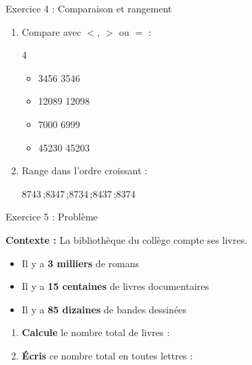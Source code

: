 \begin{exercisebox}{ Exercice 4 : Comparaison et rangement }
	\begin{enumerate}[label=\textcolor{primary}{\textbf{\alph*)}},leftmargin=*]
		\item Compare avec $<$, $>$ ou $=$ : 
		\begin{multicols}{4}
			\begin{itemize}[label=$\bullet$]
				\item \num{3456} \rep{$<$} \dotfill \num{3546}
				\item \num{12089} \rep{$<$} \dotfill \num{12098}
				\item \num{7000} \rep{$>$} \dotfill \num{6999}
				\item \num{45230} \rep{$>$} \dotfill \num{45203}
			\end{itemize}
		\end{multicols}
		\item Range dans l'ordre croissant : 
		\begin{center}
			\num{8743}\,;\quad \num{8347}\,;\quad \num{8734}\,;\quad \num{8437}\,;\quad \num{8374}
		\end{center}
	\end{enumerate}
\end{exercisebox}

\begin{exercisebox}{ Exercice 5 : Problème }
	\begin{tcolorbox}[colback=blue!5,colframe=primary!30,arc=2mm,boxrule=0.5pt]
		\textbf{Contexte :} La bibliothèque du collège compte ses livres.
		\begin{itemize}[noitemsep,topsep=5pt]
			\item Il y a \textbf{3 milliers} de romans
			\item Il y a \textbf{15 centaines} de livres documentaires
			\item Il y a \textbf{85 dizaines} de bandes dessinées
		\end{itemize}
	\end{tcolorbox}
	
	\begin{enumerate}[leftmargin=*]
		\item \textbf{Calcule} le nombre total de livres : 
		\item \textbf{Écris} ce nombre total en toutes lettres : 
	\end{enumerate}
\end{exercisebox}

